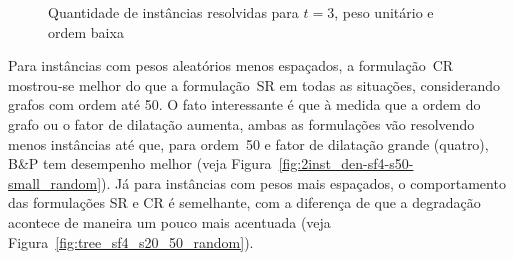 \begin{figure}%
    \centering
    \caption{Quantidade de instâncias resolvidas para $t = 3$, peso unitário e ordem baixa}%
    \label{fig:tree_sf3_s20_30_unit}%
\end{figure}

Para instâncias com pesos aleatórios menos espaçados, a formulação~CR
mostrou-se melhor do que a formulação~SR em todas as situações,
considerando grafos com ordem até 50.  O fato interessante é que à
medida que a ordem do grafo ou o fator de dilatação aumenta, ambas as
formulações vão resolvendo menos instâncias até que, para ordem~50 e
fator de dilatação grande (quatro), B\&P tem desempenho
melhor (veja Figura~\ref{fig:2inst_den-sf4-s50-small_random}).  Já
para instâncias com pesos mais espaçados, o comportamento das
formulações SR e CR é semelhante, com a diferença de que a degradação
acontece de maneira um pouco mais acentuada (veja Figura~\ref{fig:tree_sf4_s20_50_random}).


